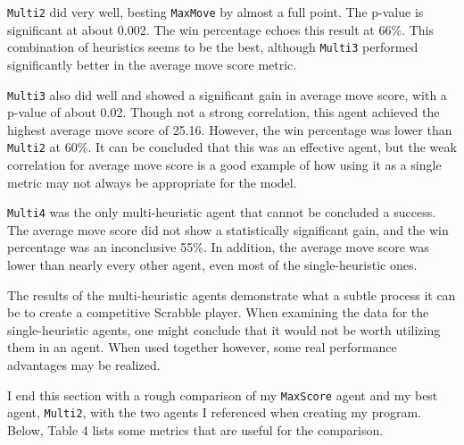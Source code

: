 \documentclass[letterpaper]{article}
\begin{document}
\texttt{Multi2} did very well, besting \texttt{MaxMove} by almost a full point. The p-value is significant at  about 0.002. The win percentage echoes this result at 66\%. This combination of heuristics seems to be the best, although \texttt{Multi3} performed significantly better in the average move score metric.

\texttt{Multi3} also did well and showed a significant gain in average move score, with a p-value of about 0.02. Though not a strong correlation, this agent achieved the highest average move score of 25.16. However, the win percentage was lower than \texttt{Multi2} at 60\%. It can be concluded that this was an effective agent, but the weak correlation for average move score is a good example of how using it as a single metric may not always be appropriate for the model.

\texttt{Multi4} was the only multi-heuristic agent that cannot be concluded a success. The average move score did not show a statistically significant gain, and the win percentage was an inconclusive 55\%. In addition, the average move score was lower than nearly every other agent, even most of the single-heuristic ones.

The results of the multi-heuristic agents demonstrate what a subtle process it can be to create a competitive Scrabble player. When examining the data for the single-heuristic agents, one might conclude that it would not be worth utilizing them in an agent. When used together however, some real performance advantages may be realized. 


I end this section with a rough comparison of my \texttt{MaxScore} agent and my best agent, \texttt{Multi2}, with the two agents I referenced when creating my program. Below, Table 4 lists some metrics that are useful for the comparison.
\end{document}
